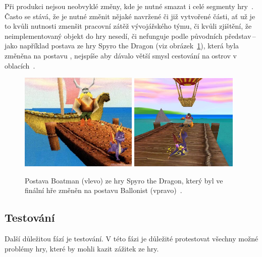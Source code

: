 Při produkci nejsou neobvyklé změny, kde je nutné smazat i celé segmenty hry~\cite{g2_game_development}. Často se stává, že je nutné změnit nějaké navržené či již vytvořené části, ať už je to kvůli nutnosti zmenšit pracovní zátěž vývojářského týmu, či kvůli zjištění, že neimplementovaný objekt do hry nesedí, či nefunguje podle původních představ\,--\,jako například postava  ze hry Spyro the Dragon (viz obrázek~\ref{fig:spyro_cut}), která byla změněna na postavu , nejspíše aby dávalo větší smysl cestování na ostrov v oblacích~\cite{GameMaker_development}.

\begin{figure}[hb]
    \vspace{0.5cm}
    \centering
    \includegraphics[width=0.5\textwidth]{obrazky-figures/ch2/Spyro-Boatman.png}\hspace{0.1cm}
    \includegraphics[width=0.46\textwidth]{obrazky-figures/ch2/Spyro-Ballonist.png}
    \caption{Postava Boatman (vlevo) ze hry Spyro the Dragon, který byl ve finální hře změněn na postavu Ballonist (vpravo)~\cite{GameMaker_development}.}
    \label{fig:spyro_cut}
\end{figure}

\subsection*{Testování}
Další důležitou fází je testování. V této fázi je důležité protestovat všechny možné problémy hry, které by mohli kazit zážitek ze hry.

